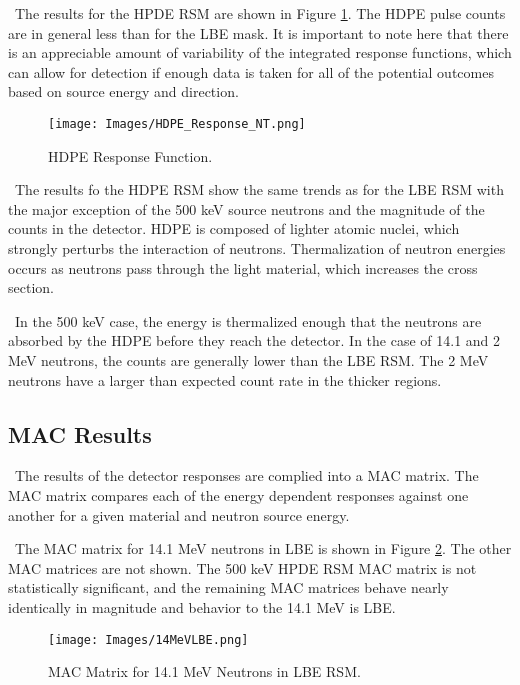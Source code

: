 \documentclass[journal]{IEEEtran}
\let\MYoriglatexcaption\caption
\renewcommand{\caption}[2][\relax]{\MYoriglatexcaption[#2]{#2}}
\begin{document}
	\ The results for the HPDE RSM are shown in Figure \ref{fig:HDPE_Response}. The HDPE pulse counts are in general less than for the LBE mask. It is important to note here that there is an appreciable amount of variability of the integrated response functions, which can allow for detection if enough data is taken for all of the potential outcomes based on source energy and direction. 
	
	\begin{figure}[h]
		\texttt{[image: Images/HDPE\_Response\_NT.png]}
		\centering
		\caption{HDPE Response Function.}
		\label{fig:HDPE_Response}
	\end{figure}
	
	\ The results fo the HDPE RSM show the same trends as for the LBE RSM with the major exception of the 500 keV source neutrons and the magnitude of the counts in the detector.  HDPE is composed of lighter atomic nuclei, which strongly perturbs the interaction of neutrons.  Thermalization of neutron energies occurs as neutrons pass through the light material, which increases the cross section. 
	
	\ In the 500 keV case, the energy is thermalized enough that the neutrons are absorbed by the HDPE before they reach the detector. In the case of 14.1 and 2 MeV neutrons, the counts are generally lower than the LBE RSM.  The 2 MeV neutrons have a larger than expected count rate in the thicker regions. 
	
	\subsection{MAC Results}
	
	\ The results of the detector responses are complied into a MAC matrix. The MAC matrix compares each of the energy dependent responses against one another for a given material and neutron source energy.  
	
    \ The MAC matrix for 14.1 MeV neutrons in LBE is shown in Figure \ref{fig:MACFig}. The other MAC matrices are not shown.  The 500 keV HPDE RSM MAC matrix is not statistically significant, and the remaining MAC matrices behave nearly identically in magnitude and behavior to the 14.1 MeV is LBE. 
	
	\begin{figure}[h]
		\texttt{[image: Images/14MeVLBE.png]}
		\centering
		\caption{MAC Matrix for 14.1 MeV Neutrons in LBE RSM.}
		\label{fig:MACFig}
	\end{figure}	
	
\end{document}
